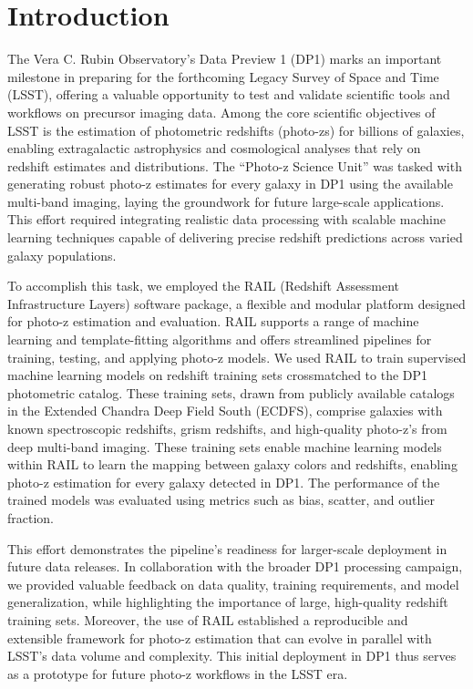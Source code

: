\section{Introduction}
\label{sec:intro:0}

The Vera C. Rubin Observatory’s Data Preview 1 (DP1) marks an important milestone in preparing for the forthcoming Legacy Survey of Space and Time (LSST), offering a valuable opportunity to test and validate scientific tools and workflows on precursor imaging data. Among the core scientific objectives of LSST is the estimation of photometric redshifts (photo-zs) for billions of galaxies, enabling extragalactic astrophysics and cosmological analyses that rely on redshift estimates and distributions. The ``Photo-z Science Unit'' was tasked with generating robust photo-z estimates for every galaxy in DP1 using the available multi-band imaging, laying the groundwork for future large-scale applications. This effort required integrating realistic data processing with scalable machine learning techniques capable of delivering precise redshift predictions across varied galaxy populations.

To accomplish this task, we employed the RAIL (Redshift Assessment Infrastructure Layers) software package, a flexible and modular platform designed for photo-z estimation and evaluation\cite{RAIL}.  RAIL supports a range of machine learning and template-fitting algorithms and offers streamlined pipelines for training, testing, and applying photo-z models.  We used RAIL to train supervised machine learning models on redshift training sets crossmatched to the DP1 photometric catalog.  These training sets, drawn from publicly available catalogs in the Extended Chandra Deep Field South (ECDFS), comprise galaxies with known spectroscopic redshifts, grism redshifts, and high-quality photo-z's from deep multi-band imaging.  These training sets enable machine learning models within RAIL to learn the mapping between galaxy colors and redshifts, enabling photo-z estimation for every galaxy detected in DP1.  The performance of the trained models was evaluated using metrics such as bias, scatter, and outlier fraction.

This effort demonstrates the pipeline's readiness for larger-scale deployment in future data releases.  In collaboration with the broader DP1 processing campaign, we provided valuable feedback on data quality, training requirements, and model generalization, while highlighting the importance of large, high-quality redshift training sets.  Moreover, the use of RAIL established a reproducible and extensible framework for photo-z estimation that can evolve in parallel with LSST’s data volume and complexity.  This initial deployment in DP1 thus serves as a prototype for future photo-z workflows in the LSST era.

